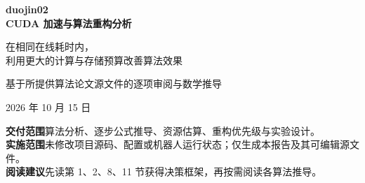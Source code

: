 \documentclass[UTF8,fontset=none,zihao=5,a4paper]{ctexart}
\numberwithin{equation}{section}
\begin{document}
\begin{titlepage}
\vspace*{15mm}
{\color{accent}\Huge\bfseries duojin02\\[4mm]CUDA 加速与算法重构分析\par}
\vspace{9mm}
{\LARGE 在相同在线耗时内，\\利用更大的计算与存储预算改善算法效果\par}
\vspace{12mm}
{\large 基于所提供算法论文源文件的逐项审阅与数学推导\par}
\vspace{7mm}
{\large 2026 年 10 月 15 日\par}
\vspace{14mm}
\noindent{}
\vfill
\noindent\textbf{交付范围}\quad 算法分析、逐步公式推导、资源估算、重构优先级与实验设计。\\
\textbf{实施范围}\quad 未修改项目源码、配置或机器人运行状态；仅生成本报告及其可编辑源文件。\\
\textbf{阅读建议}\quad 先读第 1、2、8、11 节获得决策框架，再按需阅读各算法推导。
\end{titlepage}
\tableofcontents
\clearpage








\end{document}
